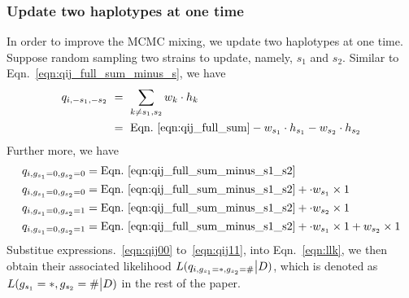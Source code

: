 \documentclass{bioinfo}
\begin{document}
\begin{methods}
\subsubsection{Update two haplotypes at one time}
In order to improve the MCMC mixing, we update two haplotypes at one time. Suppose random sampling two strains to update, namely, $s_1$ and $s_2$. Similar to Eqn.~\eqref{eqn:qij_full_sum_minus_s}, we have
\begin{equation}
\begin{split}
q_{i,-s_1, -s_2} & ~ = ~ \sum_{k\neq s_1,s_2} w_k \cdot h_k \\
                 & ~ = ~ \textrm{Eqn.~\eqref{eqn:qij_full_sum}} - w_{s_1} \cdot h_{s_1} - w_{s_2} \cdot h_{s_2} \label{eqn:qij_full_sum_minus_s1_s2}
\end{split}
\end{equation}
Further more, we have
\begin{align}
q_{i,g_{s_1}=0,g_{s_2}=0} & = \textrm{Eqn.~\eqref{eqn:qij_full_sum_minus_s1_s2}} \label{eqn:qij00}\\
q_{i,g_{s_1}=0,g_{s_2}=0} & = \textrm{Eqn.~\eqref{eqn:qij_full_sum_minus_s1_s2}} + \cdot w_{s_1} \times 1 \label{eqn:qij10}\\
q_{i,g_{s_1}=0,g_{s_2}=1} & = \textrm{Eqn.~\eqref{eqn:qij_full_sum_minus_s1_s2}} + \cdot w_{s_2} \times 1 \label{eqn:qij01}\\
q_{i,g_{s_1}=0,g_{s_2}=1} & = \textrm{Eqn.~\eqref{eqn:qij_full_sum_minus_s1_s2}} + \cdot w_{s_1} \times 1 + w_{s_2} \times 1 \label{eqn:qij11}
\end{align}
Substitue expressions.~\eqref{eqn:qij00} to~\eqref{eqn:qij11}, into Eqn.~\eqref{eqn:llk}, we then obtain their associated likelihood $L(q_{i,g_{s_1}=*,g_{s_2}=\#} \big{|} D)$, which is denoted as $L(g_{s_1}=*,g_{s_2}=\# \big{|} D)$ in the rest of the paper.


\end{methods}
\end{document}

